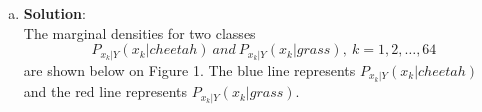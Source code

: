 \documentclass[12pt,letterpaper]{article}
\begin{document}
\begin{enumerate}[a)]
        \item 
        
        \textbf{Solution}:\\
        The marginal densities for two classes
        \begin{equation}
            P_{x_k|Y}(x_k|cheetah)\ and\ P_{x_k|Y}(x_k|grass),\ k=1,2,\ldots,64 \nonumber
        \end{equation}
        are shown below on Figure 1. The blue line represents $P_{x_k|Y}(x_k|cheetah)$ and the red line
        represents $P_{x_k|Y}(x_k|grass)$.
        \begin{figure}[H]
            \centering 
            \label{Fig.main}
        \end{figure}
        \begin{figure}[H]
            \centering 

\end{figure}
\end{enumerate}
\end{document}
